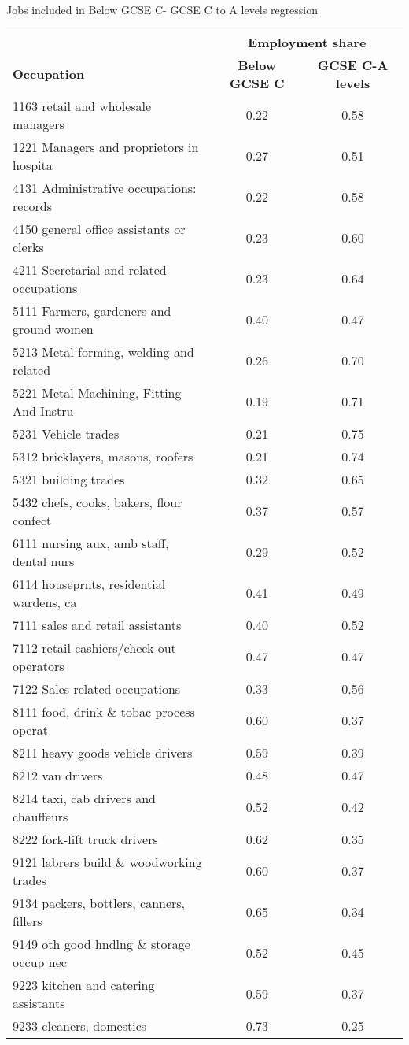 \begin{threeparttable}[h!]
	\caption{Jobs included in Below GCSE C- GCSE C to A levels regression}
		\centering
	\begin{tabular}{lcc}
	\toprule
	\toprule
	&\multicolumn{2}{c}{\textbf{Employment share}}\\
	\textbf{Occupation}&\textbf{ Below GCSE C}&\textbf{GCSE C-A levels}\\
\hline
1163 retail and wholesale managers&0.22&0.58 \\
1221 Managers and proprietors in hospita&0.27&0.51 \\
4131 Administrative occupations: records&0.22&0.58 \\
4150 general office assistants or clerks&0.23&0.60 \\
4211 Secretarial and related occupations&0.23&0.64 \\
5111 Farmers, gardeners and ground women&0.40&0.47 \\
5213 Metal forming, welding and related &0.26&0.70 \\
5221 Metal Machining, Fitting And Instru&0.19&0.71 \\
5231 Vehicle trades&0.21&0.75 \\
5312 bricklayers, masons, roofers&0.21&0.74 \\
5321 building trades&0.32&0.65 \\
5432 chefs, cooks, bakers, flour confect&0.37&0.57 \\
6111 nursing aux, amb staff, dental nurs&0.29&0.52 \\
6114 houseprnts, residential wardens, ca&0.41&0.49 \\
7111 sales and retail assistants&0.40&0.52 \\
7112 retail cashiers/check-out operators&0.47&0.47 \\
7122 Sales related occupations&0.33&0.56 \\
8111 food, drink \& tobac process operat&0.60&0.37 \\
8211 heavy goods vehicle drivers&0.59&0.39 \\
8212 van drivers&0.48&0.47 \\
8214 taxi, cab drivers and chauffeurs&0.52&0.42 \\
8222 fork-lift truck drivers&0.62&0.35 \\
9121 labrers build \& woodworking trades&0.60&0.37 \\
9134 packers, bottlers, canners, fillers&0.65&0.34 \\
9149 oth good hndlng \& storage occup nec&0.52&0.45 \\
9223 kitchen and catering assistants&0.59&0.37 \\
9233 cleaners, domestics&0.73&0.25 \\
\bottomrule
\bottomrule
\end{tabular}
\end{threeparttable}
